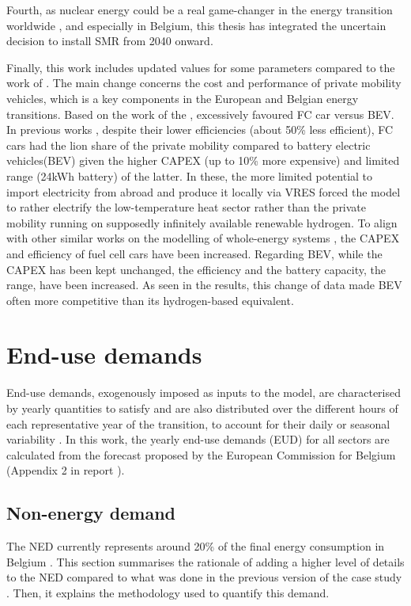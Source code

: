 Fourth, as nuclear energy could be a real game-changer in the energy transition worldwide \cite{IEA2022nuclear}, and especially in Belgium, this thesis has integrated the uncertain decision to install \gls{SMR} from 2040 onward.

Finally, this work includes updated values for some parameters compared to the work of \citet{limpens2021generating}. The main change concerns the cost and performance of private mobility vehicles, which is a key components in the European \cite{biresselioglu2018electric} and Belgian \cite{BFP_mob} energy transitions. Based on the work of the \citet{national2013transitions}, \citet{limpens2021generating} excessively favoured \gls{FC} car versus \gls{BEV}. In previous works \cite{limpens2021generating,rixhon2021role}, despite their lower efficiencies (\ie about 50\% less efficient), \gls{FC} cars had the lion share of the private mobility compared to battery electric vehicles(BEV) given the higher CAPEX (\ie up to 10\% more expensive) and limited range (\ie 24kWh battery) of the latter. In these, the more limited potential to import electricity from abroad and produce it locally via \gls{VRES} forced the model to rather electrify the low-temperature heat sector rather than the private mobility running on supposedly infinitely available renewable hydrogen. To align with other similar works on the modelling of whole-energy systems \cite{schnidrig2021modelling, EuropeanCommission2021}, the CAPEX and efficiency of fuel cell cars have been increased. Regarding \gls{BEV}, while the CAPEX has been kept unchanged, the efficiency and the battery capacity, \ie the range, have been increased. As seen in the results, this change of data made \gls{BEV} often more competitive than its hydrogen-based equivalent. 

\section{End-use demands}
\label{sec:cs:demand}
End-use demands, exogenously imposed as inputs to the model, are characterised by yearly quantities to satisfy and are also distributed over the different hours of each representative year of the transition, to account for their daily or seasonal variability \cite{Limpens2020,limpens2021generating}. In this work, the yearly end-use demands (EUD) for all sectors are calculated from the forecast proposed by the European Commission for Belgium (Appendix 2 in report \cite{EuropeanCommission2021}). 

\subsection{Non-energy demand}
\label{subsec:cs:NED}
The \gls{NED} currently represents around 20\% of the final energy consumption in Belgium \cite{FPSEconomy2021}.  This section summarises the rationale of adding a higher level of details to the \gls{NED} compared to what was done in the previous version of the case study \cite{limpens2021generating}. Then, it explains the methodology used to quantify this demand.\\

